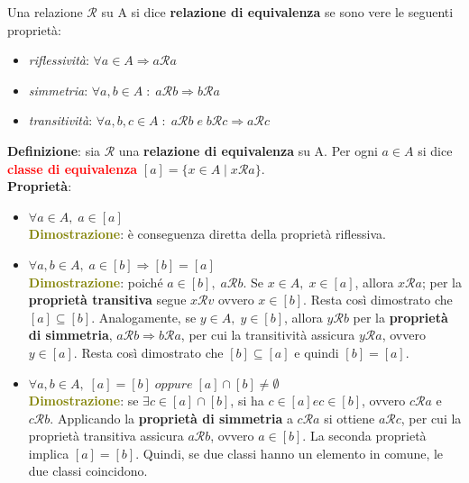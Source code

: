 Una relazione $\mathcal{R}$ su A si dice \textbf{relazione di equivalenza} se sono vere le seguenti proprietà:
\begin{itemize}[nosep]
    \item \textit{riflessività}: $\forall a \in A \Rightarrow a\mathcal{R}a$
    \item \textit{simmetria}: $\forall a,b \in A \; : \; a\mathcal{R}b \Rightarrow b\mathcal{R}a$
    \item \textit{transitività}: $\forall a,b,c \in A \; : \; a\mathcal{R}b \; e \; b\mathcal{R}c \Rightarrow a\mathcal{R}c$
\end{itemize}
\textbf{Definizione}: sia $\mathcal{R}$ una \textbf{relazione di equivalenza} su A. Per ogni $a \in A$ si dice \textcolor{red}{\textbf{classe di equivalenza}} $[a] = \{x \in A \; | \; x\mathcal{R}a\}$. \\ \newline
\textbf{Proprietà}:
\begin{itemize}[nosep]
    \item $\forall a \in A, \; a \in [a]$ \\
          \textcolor{olive}{\textbf{Dimostrazione}}: è conseguenza diretta della proprietà riflessiva.
    \item $\forall a,b \in A, \; a \in [b] \Rightarrow [b] = [a]$ \\
          \textcolor{olive}{\textbf{Dimostrazione}}: poiché $a \in [b], \; a\mathcal{R}b$. Se $x \in A, \; x \in [a]$, allora $x\mathcal{R}a$; per la \textbf{proprietà transitiva} segue $x\mathcal{R}v$ ovvero $x \in [b]$. Resta così dimostrato che $[a] \subseteq [b]$. Analogamente, se $y \in A, \; y \in [b]$, allora $y\mathcal{R}b$ per la \textbf{proprietà di simmetria}, $a\mathcal{R}b \Rightarrow b\mathcal{R}a$, per cui la transitività assicura $y\mathcal{R}a$, ovvero $y \in [a]$. Resta così dimostrato che $[b] \subseteq [a]$ e quindi $[b] = [a]$.
    \item $\forall a,b \in A, \; [a] = [b] \; oppure \; [a] \cap [b] \neq \emptyset$ \\
          \textcolor{olive}{\textbf{Dimostrazione}}: se $\exists c \in [a] \cap [b]$, si ha $c \in [a] e c \in [b]$, ovvero $c\mathcal{R}a$ e $c\mathcal{R}b$. Applicando la \textbf{proprietà di simmetria} a $c\mathcal{R}a$ si ottiene $a\mathcal{R}c$, per cui la proprietà transitiva assicura $a\mathcal{R}b$, ovvero $a \in [b]$. La seconda proprietà implica $[a] = [b]$. Quindi, se due classi hanno un elemento in comune, le due classi coincidono.
\end{itemize}
